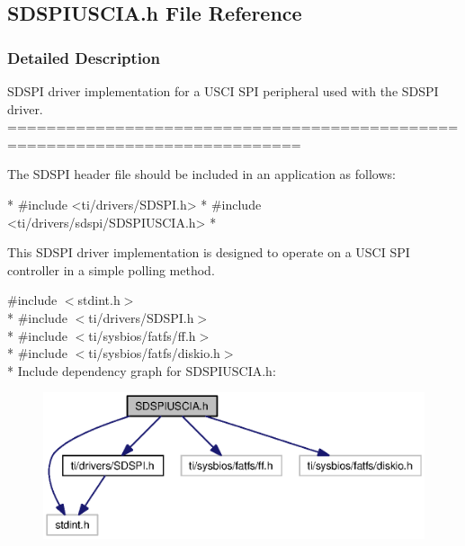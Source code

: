 \subsection{S\-D\-S\-P\-I\-U\-S\-C\-I\-A.\-h File Reference}
\label{_s_d_s_p_i_u_s_c_i_a_8h}


\subsubsection{Detailed Description}
S\-D\-S\-P\-I driver implementation for a U\-S\-C\-I S\-P\-I peripheral used with the S\-D\-S\-P\-I driver. ============================================================================

The S\-D\-S\-P\-I header file should be included in an application as follows\-: 
\begin{DoxyCode}
*  #include <ti/drivers/SDSPI.h>
*  #include <ti/drivers/sdspi/SDSPIUSCIA.h>
*  
\end{DoxyCode}


This S\-D\-S\-P\-I driver implementation is designed to operate on a U\-S\-C\-I S\-P\-I controller in a simple polling method. 

{\ttfamily \#include $<$stdint.\-h$>$}\\*
{\ttfamily \#include $<$ti/drivers/\-S\-D\-S\-P\-I.\-h$>$}\\*
{\ttfamily \#include $<$ti/sysbios/fatfs/ff.\-h$>$}\\*
{\ttfamily \#include $<$ti/sysbios/fatfs/diskio.\-h$>$}\\*
Include dependency graph for S\-D\-S\-P\-I\-U\-S\-C\-I\-A.\-h\-:
\nopagebreak
\begin{figure}[H]
\begin{center}
\leavevmode
\includegraphics[width=350pt]{_s_d_s_p_i_u_s_c_i_a_8h__incl}
\end{center}
\end{figure}
